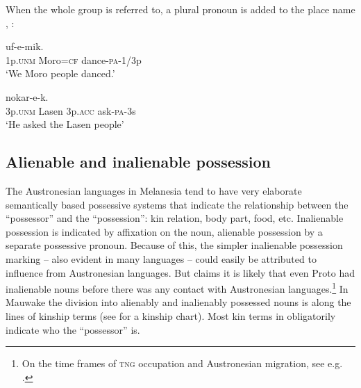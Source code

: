 When the whole group is referred to, a plural pronoun is added to the place name , :

\ea%
\label{ex:3:x422}
\gll {}  uf-e-mik. \\
1p.\textsc{unm} Moro=\textsc{cf} dance-\textsc{pa}-1/3p\\
\glt`We Moro people danced.'
\z

\ea%
\label{ex:3:x423}
\gll {}   nokar-e-k.{\upshape\footnotemark{}} \\
3p.\textsc{unm} Lasen 3p.\textsc{acc} ask-\textsc{pa}-3s\\
\glt`He asked the Lasen people'
\z


\subsection{Alienable and inalienable possession}\label{sec:3.2.4}
{}
The Austronesian languages in Melanesia tend to have very elaborate semantically based possessive systems that indicate the relationship between the ``possessor'' and the ``possession'': kin relation, body part, food, etc. Inalienable possession is indicated by affixation on the noun, alienable possession by a separate possessive pronoun. Because of this, the simpler inalienable possession marking -- also evident in many  languages -- could easily be attributed to influence from Austronesian languages. But \citet[28]{Ross1996} claims it is likely that even Proto  had inalienable nouns before there was any contact with Austronesian languages.\footnote{On the time frames of \textsc{tng} occupation and Austronesian migration, see e.g. \citet[39--41]{Ross2005}.} In Mauwake the division into alienably and inalienably possessed nouns is along the lines of kinship terms (see  for a kinship chart). Most kin terms in   obligatorily indicate who the ``possessor'' is.

